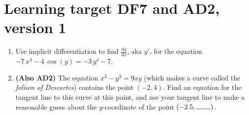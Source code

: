 \section{Learning target DF7 and AD2, version 1}
\providecommand{\stxKnowl}{}\renewcommand{\stxKnowl}[1]{#1}
\providecommand{\stxOuttro}{}\renewcommand{\stxOuttro}[1]{#1}
\providecommand{\stxTitle}{}\renewcommand{\stxTitle}[1]{#1}
\renewcommand{\stxOuttro}[1]{}
\stxKnowl{

\begin{enumerate}
\item
\stxKnowl{
Use implicit differentiation to find \(\frac{dy}{dx}\), aka \(y'\), for the equation \(-7 \, x^{4} - 4 \, \cos\left(y\right) = -3 \, y^{4} - 7\).

\stxOuttro{
\[\frac{dy}{dx}=\frac{7 \, x^{3}}{3 \, y^{3} + \sin\left(y\right)}\]

}
}
\vfill
\item
\stxKnowl{
\textbf{(Also AD2)}
The equation \(x^{3}-y^{3}=9xy\) (which makes a curve called the \textit{folium of Descartes}) contains the point \((-2, 4)\). Find an equation for the tangent line to this curve at this point, and use your tangent line to make a reasonable guess about the $y$-coordinate of the point $(-2.5, \rule{0.75cm}{0.15mm} )$.

\stxOuttro{
\(\frac{dy}{dx}=\dfrac{3x^2-9y}{9x+3y^2}\), so the slope at \((-2,4)\) is \(-0.8\), and the equation of the tangent line is \(L(x) = -0.8(x+2) +4\). Since \(L(-2.5) = 4.4\), the point \((-2.5, 4.4)\) is pretty close to being on the original function.

}
}
\vfill
\end{enumerate}
}

\pagebreak

